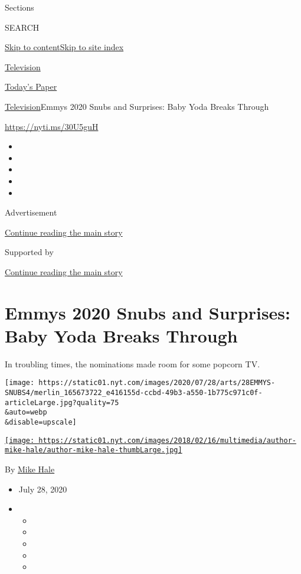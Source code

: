 Sections

SEARCH

\protect\hyperlink{site-content}{Skip to
content}\protect\hyperlink{site-index}{Skip to site index}

\href{https://www.nytimes.com/section/arts/television}{Television}

\href{https://myaccount.nytimes.com/auth/login?response_type=cookie\&client_id=vi}{}

\href{https://www.nytimes.com/section/todayspaper}{Today's Paper}

\href{/section/arts/television}{Television}\textbar{}Emmys 2020 Snubs
and Surprises: Baby Yoda Breaks Through

\url{https://nyti.ms/30U5guH}

\begin{itemize}
\item
\item
\item
\item
\item
\end{itemize}

Advertisement

\protect\hyperlink{after-top}{Continue reading the main story}

Supported by

\protect\hyperlink{after-sponsor}{Continue reading the main story}

\hypertarget{emmys-2020-snubs-and-surprises-baby-yoda-breaks-through}{%
\section{Emmys 2020 Snubs and Surprises: Baby Yoda Breaks
Through}\label{emmys-2020-snubs-and-surprises-baby-yoda-breaks-through}}

In troubling times, the nominations made room for some popcorn TV.

\texttt{[image: https://static01.nyt.com/images/2020/07/28/arts/28EMMYS-SNUBS4/merlin\_165673722\_e416155d-ccbd-49b3-a550-1b775c971c0f-articleLarge.jpg?quality=75\\\&auto=webp\\\&disable=upscale]}

\href{https://www.nytimes.com/by/mike-hale}{\texttt{[image: https://static01.nyt.com/images/2018/02/16/multimedia/author-mike-hale/author-mike-hale-thumbLarge.jpg]}}

By \href{https://www.nytimes.com/by/mike-hale}{Mike Hale}

\begin{itemize}
\item
  July 28, 2020
\item
  \begin{itemize}
  \item
  \item
  \item
  \item
  \item
  \end{itemize}
\end{itemize}

